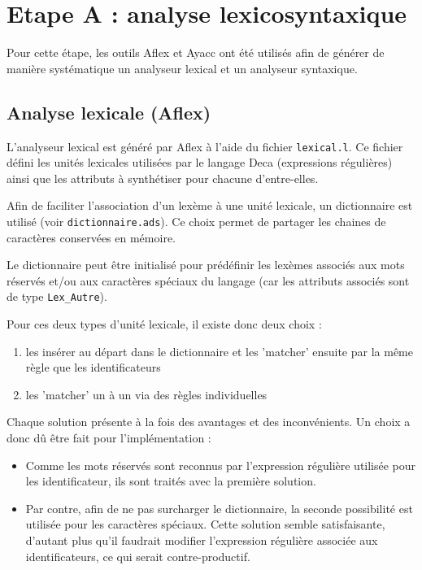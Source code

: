 \section{Etape A : analyse lexicosyntaxique}

Pour cette étape, les outils Aflex et Ayacc ont été utilisés afin de générer de manière systématique un analyseur lexical et un analyseur syntaxique.

\subsection{Analyse lexicale (Aflex)}

L'analyseur lexical est généré par Aflex à l'aide du fichier \verb!lexical.l!. Ce fichier défini les unités lexicales utilisées par le langage Deca (expressions régulières) ainsi que les attributs à synthétiser pour chacune d'entre-elles.

Afin de faciliter l'association d'un lexème à une unité lexicale, un dictionnaire est utilisé (voir \verb!dictionnaire.ads!). Ce choix permet de partager les chaines de caractères conservées en mémoire.

Le dictionnaire peut être initialisé pour prédéfinir les lexèmes associés aux mots réservés et/ou aux caractères spéciaux du langage (car les attributs associés sont de type \verb!Lex_Autre!).

Pour ces deux types d'unité lexicale, il existe donc deux choix :
\begin{enumerate}
\item les insérer au départ dans le dictionnaire et les 'matcher' ensuite par la même règle que les identificateurs
\item les 'matcher' un à un via des règles individuelles
\end{enumerate}

Chaque solution présente à la fois des avantages et des inconvénients. Un choix a donc dû être fait pour l'implémentation :
\begin{itemize}
\item Comme les mots réservés sont reconnus par l'expression régulière utilisée pour les identificateur, ils sont traités avec la première solution.
\item Par contre, afin de ne pas surcharger le dictionnaire, la seconde possibilité est utilisée pour les caractères spéciaux. Cette solution semble satisfaisante, d'autant plus qu'il faudrait modifier l'expression régulière associée aux identificateurs, ce qui serait contre-productif.
\end{itemize}

